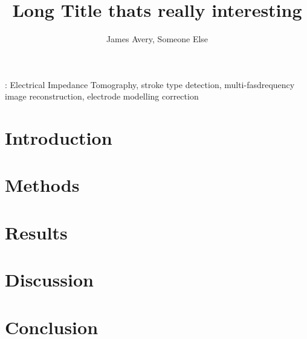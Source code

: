 \documentclass[12pt]{iopart}
\begin{document}
\title[Example Short Title]{Long Title thats really interesting}
\author{James Avery, Someone Else}

\address{University College London, London WC1E 6BT, UK }
\begin{abstract}

\end{abstract}

\vspace{2pc}
: Electrical Impedance Tomography, stroke type detection, multi-fasdrequency image reconstruction, electrode modelling correction

\submitto{\PM}
\maketitle

\section{Introduction}

\section{Methods}

\section{Results}

\section{Discussion}

\section{Conclusion}




\end{document}
